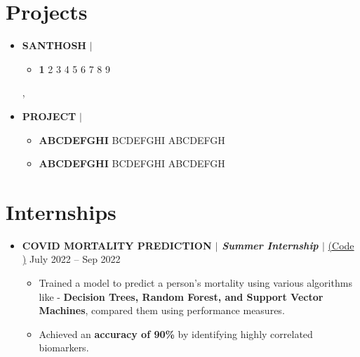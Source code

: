 \documentclass[letterpaper,5pt]{article}
\begin{document}
    
    \section{Projects}
    
        \begin{itemize}[leftmargin=0.15in,label={}]
        
          \item{
            \textbf{SANTHOSH} $|$  
            \hfill 
          }
          \begin{itemize}
            \item[\textbullet{}]\textbf{1}  2 3 4 5 6 7 8 9 
             
          \end{itemize}
          ,
          \item{
            \textbf{PROJECT} $|$  
            \hfill 
          }
          \begin{itemize}
            \item[\textbullet{}]\textbf{ABCDEFGHI} BCDEFGHI ABCDEFGH 
            \item[\textbullet{}]\textbf{ABCDEFGHI} BCDEFGHI ABCDEFGH 
          \end{itemize}
          
          
      \end{itemize}
      \vspace*{-6mm}  
          

        


    
    \section{Internships}
    \begin{itemize}
        \item[]
            \textbf{COVID MORTALITY PREDICTION $|$ \emph{Summer Internship} $|$} 
            \href{https://github.com/GSK-10/Covid_Mortality_Prediction}{({Code} \faExternalLink*)} \hfill July 2022 -- Sep 2022
            \begin{itemize}
                \item[\textbullet] Trained a model to predict a person's mortality using various algorithms like - \textbf{Decision Trees, Random Forest, and Support Vector Machines}, compared them using performance measures.
                \item[\textbullet] Achieved an \textbf{accuracy of 90\%} by identifying highly correlated biomarkers.
            \end{itemize}
    \end{itemize}
    
\end{document}
